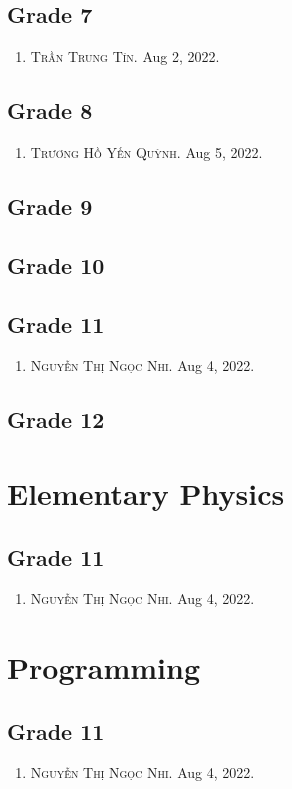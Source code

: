 \documentclass{article}
\numberwithin{equation}{section}
\begin{document}
\subsection{Grade 7}
\begin{enumerate}
	\item \textsc{Trần Trung Tín.} Aug 2, 2022.
\end{enumerate}

\subsection{Grade 8}
\begin{enumerate}
	\item \textsc{Trương Hồ Yến Quỳnh.} Aug 5, 2022.
\end{enumerate}

\subsection{Grade 9}

\subsection{Grade 10}

\subsection{Grade 11}
\begin{enumerate}
	\item \textsc{Nguyễn Thị Ngọc Nhi.} Aug 4, 2022.
\end{enumerate}

\subsection{Grade 12}

\section{Elementary Physics}

\subsection{Grade 11}
\begin{enumerate}
	\item \textsc{Nguyễn Thị Ngọc Nhi.} Aug 4, 2022.
\end{enumerate}

\section{Programming}

\subsection{Grade 11}
\begin{enumerate}
	\item \textsc{Nguyễn Thị Ngọc Nhi.} Aug 4, 2022.
\end{enumerate}


\printbibliography[heading=bibintoc]
	
\end{document}
